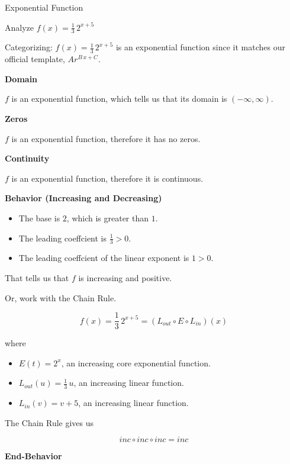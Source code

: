 \documentclass{ximera}
\begin{document}
\begin{example}  Exponential Function



Analyze   $f(x) = \frac{1}{3} \, 2^{x+5}$ 





Categorizing: $f(x) = \frac{1}{3} \, 2^{x+5}$ is an exponential function since it matches our official template, $A r^{B \, x + C}$. 


\textbf{Domain}

$f$ is an exponential function, which tells us that its domain is $(-\infty, \infty)$. 


\textbf{Zeros}

$f$ is an exponential function, therefore it has no zeros. 


\textbf{Continuity}

$f$ is an exponential function, therefore it is continuous. 



\textbf{Behavior (Increasing and Decreasing)}


\begin{itemize}
\item The base is $2$, which is greater than $1$.
\item The leading coeffcient is $\frac{1}{3} > 0$.
\item The leading coeffcient of the linear exponent is $1 > 0$.
\end{itemize}

That tells us that $f$ is increasing and positive.


Or, work with the Chain Rule.



\[ f(x) = \frac{1}{3} \, 2^{x+5} = (L_{out} \circ E \circ L_{in})(x) \]


where 


\begin{itemize}
\item $E(t) = 2^x$, an increasing core exponential function.
\item $L_{out}(u) = \frac{1}{3} \, u$, an increasing linear function.
\item $L_{in}(v) = v + 5$, an increasing linear function.
\end{itemize}

The Chain Rule gives us

\[ inc \circ inc \circ inc = inc  \]


\textbf{End-Behavior}


\end{example}
\end{document}
